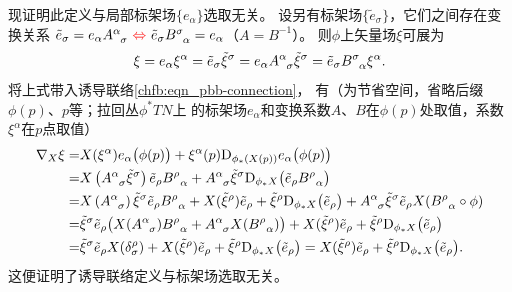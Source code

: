 现证明此定义与局部标架场$\{e_\alpha\}$选取无关。
设另有标架场$\{\tilde{e}_{\sigma}\}$，它们之间存在变换关系
$\tilde{e}_\sigma= e_\alpha A^\alpha_{\hphantom{\alpha}\sigma} {\  \color{red}\Leftrightarrow\  } 
\tilde{e}_\sigma B_{\hphantom{\alpha}\alpha}^\sigma  = e_\alpha$（$A=B^{-1}$）。
则$\phi$上矢量场$\xi$可展为
\begin{equation}
    \xi = e_\alpha \xi^\alpha = \tilde{e}_\sigma \tilde{\xi}^\sigma
    = e_\alpha A^\alpha_{\hphantom{\alpha}\sigma} \tilde{\xi}^\sigma
    = \tilde{e}_\sigma B_{\hphantom{\alpha}\alpha}^\sigma \xi^\alpha .
\end{equation}
将上式带入诱导联络\eqref{chfb:eqn_pbb-connection}，
有（为节省空间，省略后缀$\phi(p)$、$p$等；拉回丛$\phi^*TN$上
的标架场$e_\alpha$和变换系数$A$、$B$在$\phi(p)$处取值，系数$\xi^\alpha$在$p$点取值）
\begin{align*}
    \nabla_X \xi =& X(\xi^\alpha ) e_\alpha\bigl(\phi(p)\bigr)
    +\xi^\alpha(p) \mathrm{D}_{\phi_*(X(p))} e_\alpha\bigl(\phi(p)\bigr) \\
    =& X\left(A^\alpha_{\hphantom{\alpha}\sigma} \tilde{\xi}^\sigma \right) 
    \tilde{e}_\rho B_{\hphantom{\alpha}\alpha}^\rho
    + A^\alpha_{\hphantom{\alpha}\sigma} \tilde{\xi}^\sigma 
    \mathrm{D}_{\phi_*X} \bigl(\tilde{e}_\rho B_{\hphantom{\alpha}\alpha}^\rho\bigr) \\
    =& X\left(A^\alpha_{\hphantom{\alpha}\sigma}  \right) \tilde{\xi}^\sigma
    \tilde{e}_\rho B_{\hphantom{\alpha}\alpha}^\rho
    + X ( \tilde{\xi}^\rho ) \tilde{e}_\rho 
    +  \tilde{\xi}^\rho  \mathrm{D}_{\phi_*X} \bigl(\tilde{e}_\rho \bigr) 
    + A^\alpha_{\hphantom{\alpha}\sigma} \tilde{\xi}^\sigma \tilde{e}_\rho 
    X( B_{\hphantom{\alpha}\alpha}^\rho \circ \phi ) \\
    =& \tilde{\xi}^\sigma \tilde{e}_\rho \bigl(
    X(A^\alpha_{\hphantom{\alpha}\sigma}  ) B_{\hphantom{\alpha}\alpha}^\rho
    + A^\alpha_{\hphantom{\alpha}\sigma} X( B_{\hphantom{\alpha}\alpha}^\rho ) \bigr)
    + X ( \tilde{\xi}^\rho ) \tilde{e}_\rho 
    +  \tilde{\xi}^\rho  \mathrm{D}_{\phi_*X} \bigl(\tilde{e}_\rho \bigr)   \\
    =& \tilde{\xi}^\sigma \tilde{e}_\rho  X( \delta^\rho_\sigma )+
    X ( \tilde{\xi}^\rho ) \tilde{e}_\rho 
    +  \tilde{\xi}^\rho  \mathrm{D}_{\phi_*X} \bigl(\tilde{e}_\rho \bigr)
    =X ( \tilde{\xi}^\rho ) \tilde{e}_\rho 
    +  \tilde{\xi}^\rho  \mathrm{D}_{\phi_*X} \bigl(\tilde{e}_\rho \bigr) .
\end{align*}
这便证明了诱导联络定义与标架场选取无关。



